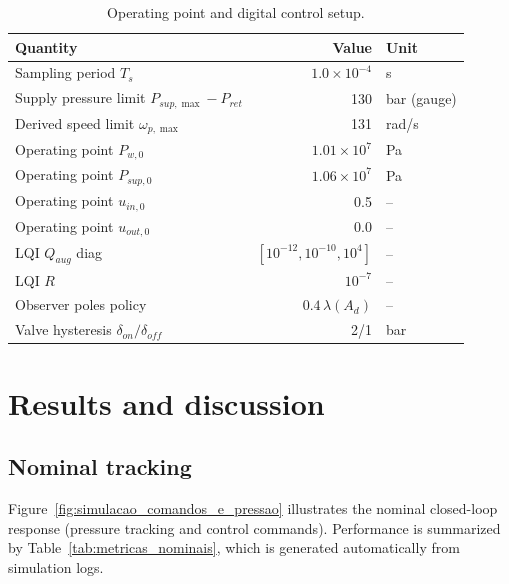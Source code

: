 \documentclass[a4paper]{ifacconf}
\begin{document}
\begin{table}[tb]
    \caption{Operating point and digital control setup.}\label{tab:setup}
    \centering
    \begin{tabular}{l r l}
        \toprule
        Quantity                                     & Value                        & Unit        \\
        \midrule
        Sampling period $T_s$                        & $1.0\times 10^{-4}$          & s           \\
        Supply pressure limit $P_{sup,\max}-P_{ret}$ & 130                          & bar (gauge) \\
        Derived speed limit $\omega_{p,\max}$        & 131                          & rad/s       \\
        Operating point $P_{w,0}$                    & $1.01\times 10^7$            & Pa          \\
        Operating point $P_{sup,0}$                  & $1.06\times 10^7$            & Pa          \\
        Operating point $u_{in,0}$                   & 0.5                          & --          \\
        Operating point $u_{out,0}$                  & 0.0                          & --          \\
        LQI $Q_{aug}$ diag                           & $[10^{-12},10^{-10},10^{4}]$ & --          \\
        LQI $R$                                      & $10^{-7}$                    & --          \\
        Observer poles policy                        & $0.4\,\lambda( A_d )$        & --          \\
        Valve hysteresis $\delta_{on}/\delta_{off}$  & 2/1                          & bar         \\
        \bottomrule
    \end{tabular}
\end{table}

\section{Results and discussion}
\subsection{Nominal tracking}
Figure~\ref{fig:simulacao_comandos_e_pressao} illustrates the nominal closed-loop response (pressure tracking and control commands). Performance is summarized by Table~\ref{tab:metricas_nominais}, which is generated automatically from simulation logs.
\end{document}
